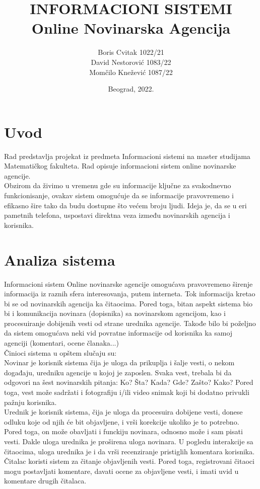 \documentclass{article}
\title{INFORMACIONI SISTEMI\\Online Novinarska Agencija}
\author{
Boris Cvitak 1022/21\\
David Nestorović 1083/22\\
Momčilo Knežević 1087/22
}
\date{Beograd, 2022.}
\begin{document}
\maketitle

\newpage

\tableofcontents

\newpage

\section{Uvod}
\indent Rad predstavlja projekat iz predmeta Informacioni sistemi na master studijama Matematičkog 
fakulteta. Rad opisuje informacioni sistem online novinarske agencije. \\
\indent Obzirom da živimo u vremenu gde su informacije ključne za svakodnevno funkcionisanje, ovakav sistem omogućuje da se informacije pravovremeno i efikasno šire tako da budu dostupne što većem broju ljudi.  Ideja je, da se u eri pametnih telefona, uspostavi direktna veza između novinarskih agencija i korisnika.

\section{Analiza sistema}
Informacioni sistem Online novinarske agencije omogućava pravovremeno širenje informacija iz raznih sfera interesovanja, putem interneta. Tok informacija kretao bi se od novinarskih agencija ka čitaocima. Pored toga, bitan aspekt sistema bio bi i komunikacija novinara (dopisnika) sa novinarskom agencijom, kao i procesuiranje dobijenih vesti od strane urednika agencije. Takođe bilo bi poželjno da sistem omogućava neki vid povratne informacije od korisnika ka samoj agenciji (komentari, ocene članaka...)  \\
\indent Činioci sistema u opštem slučaju su: \\
\indent Novinar je korisnik sistema čija je uloga da prikuplja i šalje vesti, o nekom događaju, uredniku agencije u kojoj je zaposlen. Svaka vest, trebala bi da odgovori na šest novinarskih pitanja: Ko? Šta? Kada? Gde? Zašto? Kako? Pored toga, vest može sadržati i fotografiju i/ili video snimak koji bi dodatno privukli pažnju korisnika. \\
\indent Urednik je korisnik sistema, čija je uloga da procesuira dobijene vesti, donese odluku koje od njih će bit objavljene, i vrši korekcije ukoliko je to potrebno. Pored toga, on može obavljati i funckiju novinara, odnosno može i sam pisati vesti. Dakle uloga urednika je proširena uloga novinara. U pogledu interakcije sa čitaocima, uloga urednika je i da vrši recenziranje pristiglih komentara korisnika. \\
\indent Čitalac koristi sistem za čitanje objavljenih vesti. Pored toga, registrovani čitaoci mogu postavljati komentare, davati ocene za objavljene vesti, i imati uvid u komentare drugih čitalaca.
\end{document}
